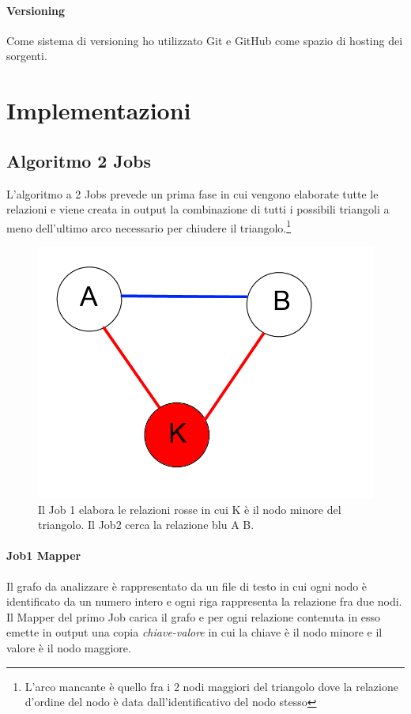 \documentclass[paper=a4, fontsize=11pt]{scrartcl}	%
\numberwithin{equation}{section}															%
\numberwithin{figure}{section}																%
\numberwithin{table}{section}																%
\begin{document}
\paragraph{Versioning}
Come sistema di versioning ho utilizzato Git e GitHub come spazio di hosting dei sorgenti.


\section{Implementazioni}
\subsection{Algoritmo 2 Jobs}
L'algoritmo a 2 Jobs prevede un prima fase in cui vengono elaborate tutte le relazioni e viene creata in output la combinazione di tutti i possibili triangoli a meno dell'ultimo arco necessario per chiudere il triangolo.\footnote{L'arco mancante è quello fra i 2 nodi maggiori del triangolo dove la relazione d'ordine del nodo è data dall'identificativo del nodo stesso} \\


\begin{figure}[h]
\centering
        \includegraphics[totalheight=6cm]{Graph1.png}
    \caption{Il Job 1 elabora le relazioni rosse in cui K è il nodo minore del triangolo. Il Job2 cerca la relazione blu A B.}
    \label{fig:verticalcell} 
\end{figure}
\paragraph{Job1 Mapper}
Il grafo da analizzare è rappresentato da un file di testo in cui ogni nodo è identificato da un numero intero e ogni riga rappresenta la relazione fra due nodi.\\
Il Mapper del primo Job carica il grafo e per ogni relazione contenuta in esso emette in output una copia \textit{chiave-valore} in cui la chiave è il nodo minore e il valore è il nodo maggiore.
\end{document}
